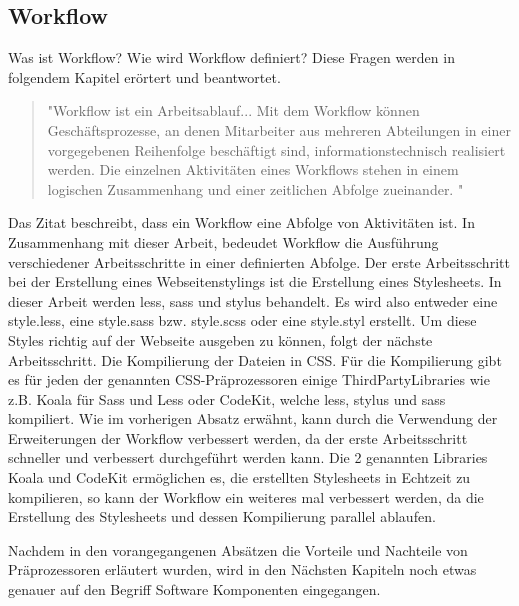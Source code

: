 \subsection{Workflow}
Was ist Workflow? Wie wird Workflow definiert?\newline
Diese Fragen werden in folgendem Kapitel erörtert und beantwortet.\newline
\begin{quote}
"Workflow ist ein Arbeitsablauf... Mit dem Workflow können Geschäftsprozesse, an denen Mitarbeiter aus mehreren Abteilungen in einer vorgegebenen Reihenfolge beschäftigt sind, informationstechnisch realisiert werden. Die einzelnen Aktivitäten eines Workflows stehen in einem logischen Zusammenhang und einer zeitlichen Abfolge zueinander. "
\autocite[]{ITWissen.info.2014}
\end{quote}
Das Zitat beschreibt, dass ein Workflow eine Abfolge von Aktivitäten ist. In Zusammenhang mit dieser Arbeit, bedeudet Workflow die Ausführung verschiedener Arbeitsschritte in einer definierten Abfolge.\newline
Der erste Arbeitsschritt bei der Erstellung eines Webseitenstylings ist die Erstellung eines Stylesheets. In dieser Arbeit werden less, sass und stylus behandelt. Es wird also entweder eine style.less, eine style.sass bzw. style.scss oder eine style.styl erstellt. \newline
Um diese Styles richtig auf der Webseite ausgeben zu können, folgt der nächste Arbeitsschritt. Die Kompilierung der Dateien in CSS.\newline
Für die Kompilierung gibt es für jeden der genannten CSS-Präprozessoren einige ThirdPartyLibraries wie z.B. Koala für Sass und Less oder CodeKit, welche less, stylus und sass kompiliert. \newline
Wie im vorherigen Absatz erwähnt, kann durch die Verwendung der Erweiterungen der Workflow verbessert werden, da der erste Arbeitsschritt schneller und verbessert durchgeführt werden kann. \newline
Die 2 genannten Libraries Koala und CodeKit ermöglichen es, die erstellten Stylesheets in Echtzeit zu kompilieren, so kann der Workflow ein weiteres mal verbessert werden, da die Erstellung des Stylesheets und dessen Kompilierung parallel ablaufen.

Nachdem in den vorangegangenen Absätzen die Vorteile und Nachteile von Präprozessoren erläutert wurden, wird in den Nächsten Kapiteln noch etwas genauer auf den Begriff \glqq{} Software Komponenten \grqq{} eingegangen.
\newpage

